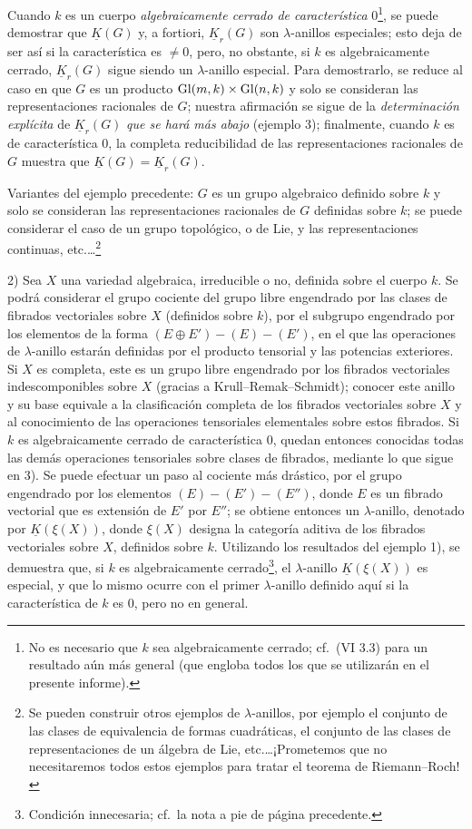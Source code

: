 Cuando $k$ es un cuerpo \emph{algebraicamente cerrado de característica} $0$\footnote{No es necesario que $k$ sea algebraicamente cerrado; cf.\ (VI 3.3) para un resultado aún más general (que engloba todos los que se utilizarán en el presente informe).}, se puede demostrar que $\underline{K}(G)$ y, a fortiori, $\underline{K}_r(G)$ son $\lambda$-anillos especiales; esto deja de ser así si la característica es $\neq 0$, pero, no obstante, si $k$ es algebraicamente cerrado, $\underline{K}_r(G)$ sigue siendo un $\lambda$-anillo especial. Para demostrarlo, se reduce al caso en que $G$ es un producto $\operatorname{Gl}(m,k)\times\operatorname{Gl}(n,k)$ y solo se consideran las representaciones racionales de $G$; nuestra afirmación se sigue de la \emph{determinación explícita} de $\underline{K}_r(G)$ \emph{que se hará más abajo} (ejemplo 3); finalmente, cuando $k$ es de característica $0$, la completa reducibilidad de las representaciones racionales de $G$ muestra que $\underline{K}(G)=\underline{K}_r(G)$.

Variantes del ejemplo precedente: $G$ es un grupo algebraico definido sobre $k$ y solo se consideran las representaciones racionales de $G$ definidas sobre $k$; se puede considerar el caso de un grupo topológico, o de Lie, y las representaciones continuas, etc.\dots\footnote{Se pueden construir otros ejemplos de $\lambda$-anillos, por ejemplo el conjunto de las clases de equivalencia de formas cuadráticas, el conjunto de las clases de representaciones de un álgebra de Lie, etc.\dots ¡Prometemos que no necesitaremos todos estos ejemplos para tratar el teorema de Riemann--Roch!}

2) Sea $X$ una variedad algebraica, irreducible o no, definida sobre el cuerpo $k$. Se podrá considerar el grupo cociente del grupo libre engendrado por las clases de fibrados vectoriales sobre $X$ (definidos sobre $k$), por el subgrupo engendrado por los elementos de la forma $(E\oplus E')-(E)-(E')$, en el que las operaciones de $\lambda$-anillo estarán definidas por el producto tensorial y las potencias exteriores. Si $X$ es completa, este es un grupo libre engendrado por los fibrados vectoriales indescomponibles sobre $X$ (gracias a Krull--Remak--Schmidt); conocer este anillo y su base equivale a la clasificación completa de los fibrados vectoriales sobre $X$ y al conocimiento de las operaciones tensoriales elementales sobre estos fibrados. Si $k$ es algebraicamente cerrado de característica $0$, quedan entonces conocidas todas las demás operaciones tensoriales sobre clases de fibrados, mediante lo que sigue en 3). Se puede efectuar un paso al cociente más drástico, por el grupo engendrado por los elementos $(E)-(E')-(E'')$, donde $E$ es un fibrado vectorial que es extensión de $E'$ por $E''$; se obtiene entonces un $\lambda$-anillo, denotado por $\underline{K}(\xi(X))$, donde $\xi(X)$ designa la categoría aditiva de los fibrados vectoriales sobre $X$, definidos sobre $k$. Utilizando los resultados del ejemplo 1), se demuestra que, si $k$ es algebraicamente cerrado\footnote{Condición innecesaria; cf.\ la nota a pie de página precedente.}, el $\lambda$-anillo $\underline{K}(\xi(X))$ es especial, y que lo mismo ocurre con el primer $\lambda$-anillo definido aquí si la característica de $k$ es $0$, pero no en general.

